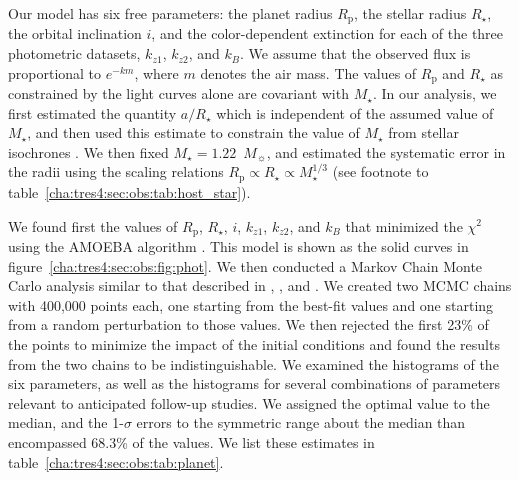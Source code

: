Our model has six free parameters: the planet radius $R_{\mathrm p}$, the stellar
radius $R_{\star}$, the orbital inclination $i$, and the color-dependent extinction for each of the three photometric datasets,
$k_{z1}$, $k_{z2}$, and $k_B$. We assume that the observed flux is proportional
to $e^{-km}$, where $m$ denotes the air mass. The values of $R_{\mathrm p}$ and
$R_{\star}$ as constrained by the light curves alone are covariant with
$M_{\star}$. In our analysis, we first estimated the quantity $a / R_{\star}$ which
is independent of the assumed value of $M_{\star}$, and then used this estimate
to constrain the value of $M_{\star}$ from stellar isochrones
\citep{Sozzetti_Torres_Charbonneau:apj:2007a, Holman_Winn_Latham:apj:2007a}. We then fixed $M_{\star} = 1.22$~$M_{\sun}$, and
estimated the systematic error in the radii using the scaling
relations $R_{\mathrm p} \propto R_{\star} \propto M_{\star}^{1/3}$ (see footnote to
table~\ref{cha:tres4:sec:obs:tab:host_star}).

We found first the values of $R_{\mathrm p}$, $R_{\star}$, $i$, $k_{z1}$, $k_{z2}$,
and $k_B$ that minimized the ${\chi}^{2}$ using the AMOEBA algorithm
\citep{Press_Teukolsky_Vetterling:1992a}. This model is shown as the solid curves in figure~\ref{cha:tres4:sec:obs:fig:phot}.
We then conducted a Markov Chain Monte Carlo analysis similar to that described
in \citet{Holman_Winn_Latham:apj:2006a}, \citet{Charbonneau_Winn_Everett:apj:2007a}, and \citet{Winn_Holman_Roussanova:apj:2007a}.
We created two MCMC chains
with 400,000 points each, one starting from the best-fit values and one
starting from a random perturbation to those values. We
then rejected the first 23\% of the points to minimize the impact of
the initial conditions and found the results from the two chains to be
indistinguishable. We examined the histograms of the six parameters, as well as
the histograms for several combinations of parameters relevant to anticipated
follow-up studies. We assigned the optimal value to the median, and the
1-$\sigma$ errors to the symmetric range about the median than encompassed
68.3\% of the values. We list these estimates in table~\ref{cha:tres4:sec:obs:tab:planet}.


